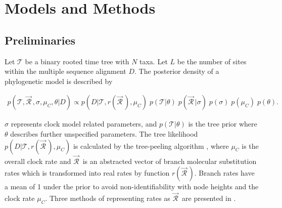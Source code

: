 \documentclass[10pt,letterpaper]{article}
\begin{document}







\section*{Models and Methods} \label{sect:models}



\subsection*{Preliminaries}



Let $\mathcal{T}$ be a binary rooted time tree with $N$ taxa. Let $L$ be the number of sites within the multiple sequence alignment $D$. 
The posterior density of a phylogenetic model is described by

\begin{eqnarray}
\label{eq:bayesian}
p(\mathcal{T}, \vec{\mathcal{R}}^{\,}, \sigma, \mu_C, \theta|D) \propto  p(D|\mathcal{T}, r(\vec{\mathcal{R}}^{\,}), \mu_C) \; p(\mathcal{T}|\theta) \;  p(\vec{\mathcal{R}}^{\,} | \sigma) \; p(\sigma) \; p(\mu_C) \; p(\theta).
\end{eqnarray}


$\sigma$ represents clock model related parameters, and $p(\mathcal{T}|\theta)$ is the tree prior where $\theta$ describes further unspecified parameters. 
The tree likelihood $p(D|\mathcal{T}, r(\vec{\mathcal{R}}^{\,}), \mu_C)$ is
calculated by the tree-peeling algorithm \cite{felsenstein1981evolutionary}, where $\mu_C$ is the overall clock rate and
$\vec{\mathcal{R}}^{\,}$ is an abstracted vector of branch molecular substitution rates which is transformed into real rates by function $r(\vec{\mathcal{R}}^{\,})$. 
Branch rates have a mean of 1 under the prior to avoid non-identifiability with node heights and the clock rate $\mu_C$.
Three methods of representing rates as $\vec{\mathcal{R}}^{\,}$ are presented in \textbf{}.  
\end{document}
